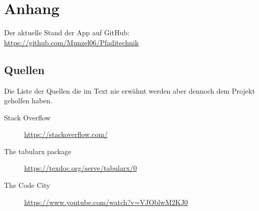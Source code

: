 \setcounter{chapter}{6}
\chapter{Anhang}
Der aktuelle Stand der App auf GitHub: \url{https://github.com/Munzel06/Pfaditechnik} \\
\section{Quellen}
Die Liste der Quellen die im Text nie erwähnt werden aber dennoch dem Projekt geholfen haben. \\
\begin{description}
    \item[Stack Overflow] \url{https://stackoverflow.com/}
    \item[The tabularx package] \url{https://texdoc.org/serve/tabularx/0}
    \item[The Code City] \url{https://www.youtube.com/watch?v=VJOblwM2KJ0}
\end{description}